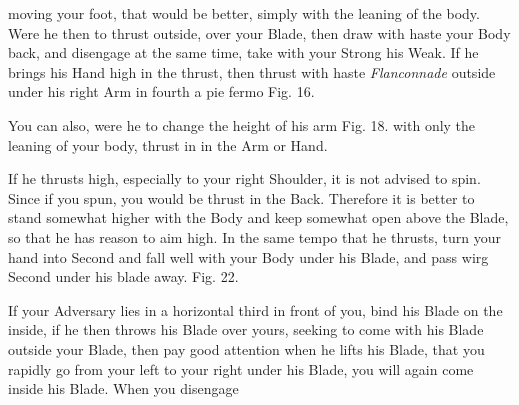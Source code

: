 \newpage


\newpage


moving your foot, that would be better, simply with the leaning of the
body. Were he then to thrust outside, over your Blade, then draw with
haste your Body back, and disengage at the same time, take with your
Strong his Weak. If he brings his Hand high in the thrust, then thrust
with haste {\it Flanconnade} outside under his right Arm in fourth a pie
fermo Fig. 16.

\exercise{}

You can also, were he to change the height of his arm Fig. 18. with
only the leaning of your body, thrust in in the Arm or Hand.

\exercise{}


If he thrusts high, especially to your right Shoulder, it is not
advised to spin. Since if you spun, you would be thrust in the
Back. Therefore it is better to stand somewhat higher with the Body
and keep somewhat open above the Blade, so that he has reason to aim
high. In the same tempo that he thrusts, turn your hand into Second
and fall well with your Body under his Blade, and pass wirg Second
under his blade away. Fig. 22.

\exercise{}


If your Adversary lies in a horizontal third in front of you, bind his
Blade on the inside, if he then throws his Blade over yours, seeking
to come with his Blade outside your Blade, then pay good attention
when he lifts his Blade, that you rapidly go from your left to your
right under his Blade, you will again come inside his Blade. When you
disengage
